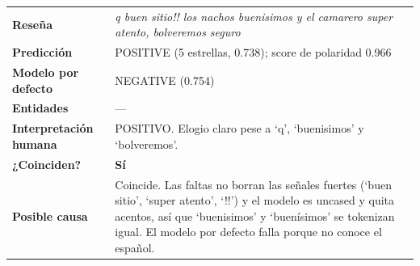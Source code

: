 \documentclass[12pt,a4paper]{article}
\begin{document}
\par\noindent\begin{minipage}{\linewidth}\centering\small\renewcommand{\arraystretch}{1.3}
\begin{tabular}{|>{\raggedright\arraybackslash}p{3.1cm}|>{\raggedright\arraybackslash}p{11.9cm}|}
\hline
\multicolumn{2}{|l|}{\textbf{\textcolor{azulUVG}{\#16 · Errores ortográficos}}} \\ \hline
\textbf{Reseña} & \emph{q buen sitio!! los nachos buenisimos y el camarero super atento, bolveremos seguro} \\ \hline
\textbf{Predicción} & POSITIVE (5 estrellas, 0.738); score de polaridad 0.966 \\ \hline
\textbf{Modelo por defecto} & NEGATIVE (0.754) \\ \hline
\textbf{Entidades} & — \\ \hline
\textbf{Interpretación humana} & POSITIVO. Elogio claro pese a `q', `buenisimos' y `bolveremos'. \\ \hline
\textbf{¿Coinciden?} & \textbf{\textcolor{verde}{Sí}} \\ \hline
\textbf{Posible causa} & Coincide. Las faltas no borran las señales fuertes (`buen sitio', `super atento', `!!') y el modelo es uncased y quita acentos, así que `buenisimos' y `buenísimos' se tokenizan igual. El modelo por defecto falla porque no conoce el español. \\ \hline
\end{tabular}
\end{minipage}\par\bigskip
\end{document}
